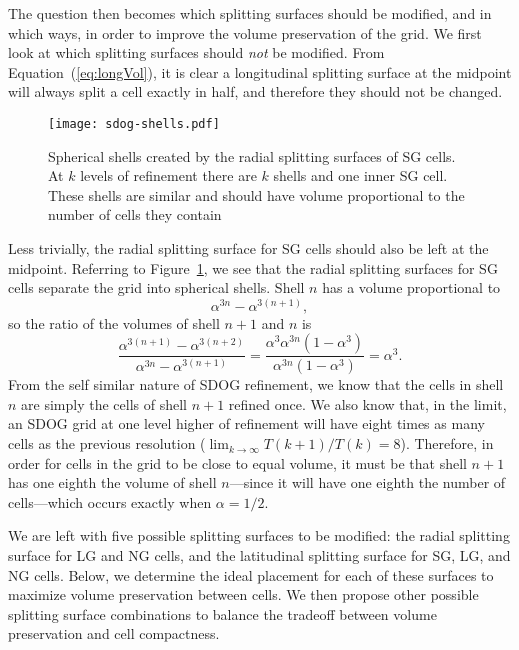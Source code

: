 The question then becomes which splitting surfaces should be modified, and in which ways, in order to improve the volume preservation of the grid.
We first look at which splitting surfaces should \textit{not} be modified.
From Equation~(\ref{eq:longVol}), it is clear a longitudinal splitting surface at the midpoint will always split a cell exactly in half, and therefore they should not be changed.


\begin{figure}[ht!]
	\centering
	\texttt{[image: sdog-shells.pdf]}
	\caption[Spherical shells that result from SDOG refinement]{
		Spherical shells created by the radial splitting surfaces of SG cells.
		At $k$ levels of refinement there are $k$ shells and one inner SG cell.
		These shells are similar and should have volume proportional to the number of cells they contain
	}
	\label{fig:sdog-shells}
\end{figure}


Less trivially, the radial splitting surface for SG cells should also be left at the midpoint.
Referring to Figure~\ref{fig:sdog-shells}, we see that the radial splitting surfaces for SG cells separate the grid into spherical shells.
Shell $n$ has a volume proportional to
%
\begin{equation*}
\alpha^{3n} - \alpha^{3 \left( n + 1 \right)},
\end{equation*}
%
so the ratio of the volumes of shell $n+1$ and $n$ is
%
\begin{equation*}
\frac{ \alpha^{3 \left(n + 1 \right)} - \alpha^{3\left( n + 2 \right)} }{ \alpha^{3n} - \alpha^{3 \left( n + 1 \right)} } = \frac{ \alpha^{3} \alpha^{3n} \left( 1 - \alpha^{3} \right) }{ \alpha^{3n} \left( 1 - \alpha^{3} \right) } = \alpha^{3}.
\end{equation*}
%
From the self similar nature of SDOG refinement, we know that the cells in shell $n$ are simply the cells of shell $n+1$ refined once.
We also know that, in the limit, an SDOG grid at one level higher of refinement will have eight times as many cells as the previous resolution ($\lim_{k \to \infty} T(k+1) / T(k)  = 8 $).
Therefore, in order for cells in the grid to be close to equal volume, it must be that shell $n+1$ has one eighth the volume of shell $n$---since it will have one eighth the number of cells---which occurs exactly when $\alpha = 1 / 2$.


We are left with five possible splitting surfaces to be modified: the radial splitting surface for LG and NG cells, and the latitudinal splitting surface for SG, LG, and NG cells.
Below, we determine the ideal placement for each of these surfaces to maximize volume preservation between cells.
We then propose other possible splitting surface combinations to balance the tradeoff between volume preservation and cell compactness.


